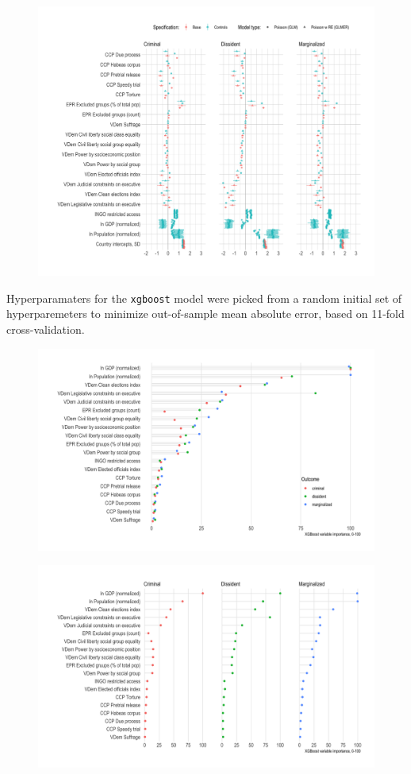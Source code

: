 \documentclass[12pt]{article}
\begin{document}
\begin{figure}
\includegraphics[width=.9\textwidth]{../output/figures/model-coefs-all-model-forms.png}
\end{figure}

Hyperparamaters for the \texttt{xgboost} model were picked from a random initial set of hyperparemeters to minimize out-of-sample mean absolute error, based on 11-fold cross-validation. 

\begin{figure}
\includegraphics[width=.9\textwidth]{../output/figures/xgboost-variable-importance-v1.png}
\end{figure}

\begin{figure}
\includegraphics[width=.9\textwidth]{../output/figures/xgboost-variable-importance-v2.png}
\end{figure}
\end{document}
